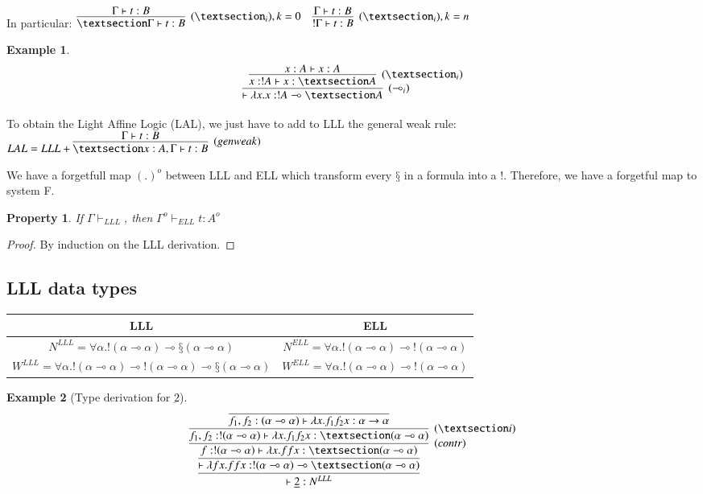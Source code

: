 \documentclass[a4paper,10pt]{article}
\newcommand{\impl}{\rightarrow}	%
\newcommand{\limpl}{\multimap}  %
\newtheorem{prop}{Property}
\newtheorem{ex}{Example}
\begin{document}
In particular:
$	\infer[(§_i), k=0]{§\Gamma \vdash t: B}{\Gamma \vdash t: B} \quad
	\infer[(§_i), k=n]{!\Gamma \vdash t: B}{\Gamma \vdash t: B}
$

\begin{ex}
$$ \infer[(\limpl_i)]{\vdash \lambda x.x : !A \limpl §A}{
	\infer[(§_i)]{x:!A \vdash x:§A}{x:A \vdash x:A}
	}
$$
\end{ex}

\par To obtain the Light Affine Logic (LAL), we just have to add to LLL the general weak rule:
$LAL = LLL + \infer[(gen weak)]{§x:A, \Gamma \vdash t: B}{\Gamma \vdash t: B}$

\par We have a forgetfull map $(.)^{o}$ between LLL and ELL which transform every $§$ in a formula into a $!$. Therefore, we have a forgetful map to system F.

\begin{prop}
If $\Gamma \vdash_{LLL}$, then $\Gamma^o \vdash_{ELL} t:A^o$
\end{prop}
\begin{proof}
By induction on the LLL derivation.
\end{proof}


\subsection{LLL data types}

\begin{center}
\begin{tabular}{|c|c|}
\hline
LLL & ELL \\
\hline
$N^{LLL}=\forall \alpha. !(\alpha \limpl \alpha) \limpl §(\alpha \limpl \alpha)$ & $N^{ELL} = \forall \alpha. !(\alpha \limpl \alpha) \limpl !(\alpha \limpl \alpha)$\\
\hline
$W^{LLL}=\forall \alpha.!(\alpha \limpl \alpha) \limpl !(\alpha \limpl \alpha) \limpl §(\alpha \limpl \alpha)$ & $W^{ELL} = \forall \alpha. !(\alpha \limpl \alpha) \limpl !(\alpha \limpl \alpha)$\\
\hline
\end{tabular}
\end{center}

\begin{ex}[Type derivation for $\underbar{2}$]
$$	\infer{\vdash \underbar{2}:N^{LLL}}{
		\infer{\vdash \lambda f x. f f x : !(\alpha \limpl \alpha) \limpl §(\alpha \limpl \alpha)}{
			\infer[(contr)]{f: !(\alpha \limpl \alpha) \vdash \lambda x. f f x : §(\alpha \limpl \alpha)}{
				\infer[(§i)]{f_1,f_2:!(\alpha \limpl \alpha) \vdash \lambda x. f_1 f_2 x:§(\alpha \limpl \alpha)}{
				\infer{f_1,f_2:(\alpha \limpl \alpha) \vdash \lambda x.f_1 f_2 x: \alpha \impl \alpha}{}
				}
			}
		}
	}$$
\end{ex}
\end{document}
